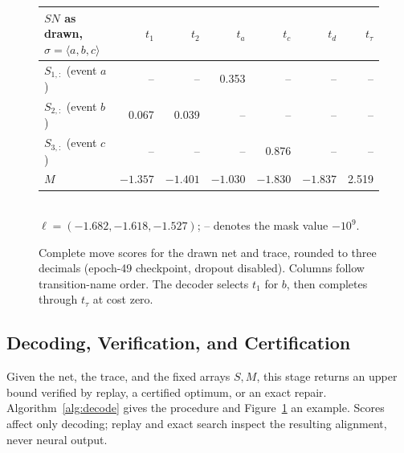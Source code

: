 \documentclass[manuscript,screen,nonacm]{acmart}
\begin{document}
\begin{figure}
\smallskip
{\footnotesize
\begin{tabular}{@{}lrrrrrr@{}}
\toprule
$SN$ as drawn, $\sigma=\langle a,b,c\rangle$ & $t_1$ & $t_2$ & $t_a$ & $t_c$ & $t_d$ & $t_\tau$\\
\midrule
$S_{1,:}$ (event $a$) & -- & -- & 0.353 & -- & -- & --\\
$S_{2,:}$ (event $b$) & 0.067 & 0.039 & -- & -- & -- & --\\
$S_{3,:}$ (event $c$) & -- & -- & -- & 0.876 & -- & --\\
$M$ & $-1.357$ & $-1.401$ & $-1.030$ & $-1.830$ & $-1.837$ & 2.519\\
\bottomrule
\end{tabular}\\[2pt]
$\ell=(-1.682,-1.618,-1.527)$; -- denotes the mask value $-10^9$.}
\caption{Complete move scores for the drawn net and trace, rounded to three decimals (epoch-49 checkpoint, dropout disabled). Columns follow transition-name order. The decoder selects $t_1$ for $b$, then completes through $t_\tau$ at cost zero.}
\label{fig:decoding}

\end{figure}

\subsection{Decoding, Verification, and Certification}
\label{sec:decoding}

Given the net, the trace, and the fixed arrays $S,M$, this stage returns an upper bound verified by replay, a certified optimum, or an exact repair. Algorithm~\ref{alg:decode} gives the procedure and Figure~\ref{fig:decoding} an example. Scores affect only decoding; replay and exact search inspect the resulting alignment, never neural output.
\end{document}
